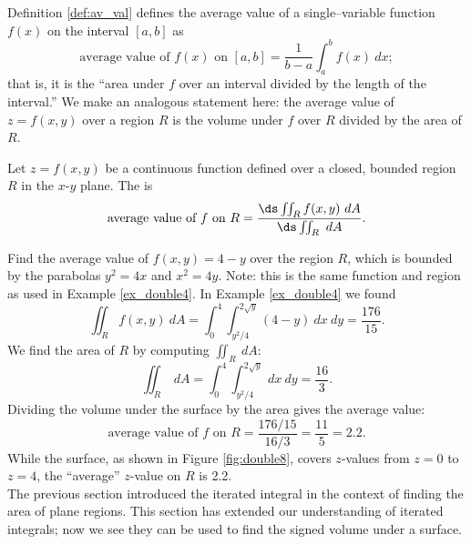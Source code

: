 Definition \ref{def:av_val} defines the average value of a single--variable function $f(x)$ on the interval $[a,b]$ as
$$\text{average value of $f(x)$ on $[a,b]$} = \frac1{b-a}\int_a^b f(x)\ dx;$$
that is, it is the ``area under $f$ over an interval divided by the length of the interval.'' We make an analogous statement here: the average value of $z=f(x,y)$ over a region $R$ is the volume under $f$ over $R$ divided by the area of $R$.

{Let $z=f(x,y)$ be a continuous function defined over a closed, bounded region $R$ in the $x$-$y$ plane. The  is 
$$\text{average value of $f$ on $R$} = \frac{\ds \iint_R f(x,y)\ dA}{\ds\iint_R \ dA}.$$
}

{Find the average value of $f(x,y) = 4-y$ over the region $R$, which is bounded by the parabolas $y^2=4x$ and $x^2=4y$. Note: this is the same function and region as used in Example \ref{ex_double4}.
}
{In Example \ref{ex_double4} we found 
$$\iint_R f(x,y)\ dA = \int_0^4\int_{y^2/4}^{2\sqrt{y}}(4-y)\ dx\ dy = \frac{176}{15}.$$ 
We find the area of $R$ by computing $\iint_R \ dA$:
$$\iint_R \ dA = \int_0^4\int_{y^2/4}^{2\sqrt{y}} \ dx\ dy = \frac{16}{3}.$$
Dividing the volume under the surface by the area gives the average value:
$$\text{average value of $f$ on $R$} = \frac{176/15}{16/3} = \frac{11}5 = 2.2.$$
While the surface, as shown in Figure \ref{fig:double8}, covers $z$-values from $z=0$ to $z=4$, the ``average'' $z$-value on $R$ is 2.2.
}\\

The previous section introduced the iterated integral in the context of finding the area of plane regions. This section has extended our understanding of iterated integrals; now we see they can be used to find the signed volume under a surface. 

